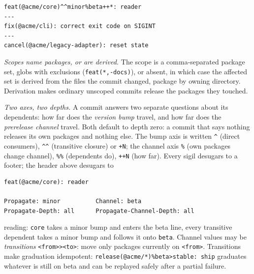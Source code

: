 \documentclass[sigconf,nonacm]{acmart}
\newcommand{\code}[1]{\texttt{#1}}
\begin{document}
\begin{small}
\begin{verbatim}
feat(@acme/core)^^minor%beta++*: reader
---
fix(@acme/cli): correct exit code on SIGINT
---
cancel(@acme/legacy-adapter): reset state
\end{verbatim}
\end{small}

\emph{Scopes name packages, or are derived.} The scope is a
comma-separated package set, globs with exclusions
(\code{feat(*,-docs)}), or absent, in which case the affected set is
derived from the files the commit changed, package by owning directory.
Derivation makes ordinary unscoped commits release the packages they touched.

\emph{Two axes, two depths.} A commit answers two separate questions
about its dependents: how far does the \emph{version bump} travel, and
how far does the \emph{prerelease channel} travel. Both default to depth
zero: a commit that says nothing releases its own packages and nothing
else. The bump axis is written \code{\^{}} (direct consumers),
\code{\^{}\^{}} (transitive closure) or \code{+N}; the channel axis
\code{\%} (own packages change channel), \code{\%\%} (dependents do),
\code{++N} (how far). Every sigil desugars to a footer; the header above
desugars to
\begin{small}
\begin{verbatim}
feat(@acme/core): reader

Propagate: minor          Channel: beta
Propagate-Depth: all      Propagate-Channel-Depth: all
\end{verbatim}
\end{small}
reading: \code{core} takes a minor bump and enters the beta line, every
transitive dependent takes a minor bump and follows it onto \code{beta}.
Channel values may be \emph{transitions} \code{<from>><to>}: move only
packages currently on \code{<from>}. Transitions make graduation
idempotent: \code{release(@acme/*)\%beta>stable:~ship} graduates
whatever is still on beta and can be replayed safely after a partial
failure.
\end{document}
